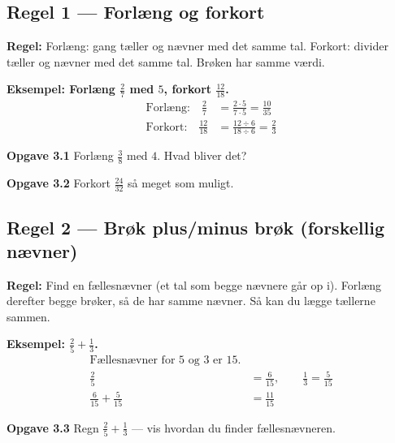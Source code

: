 \documentclass[11pt,a4paper]{article}
\begin{document}
\subsection*{Regel 1 --- Forlæng og forkort}

\begin{regelbox}
\textbf{Regel:} Forlæng: gang tæller og nævner med det samme tal. Forkort:
divider tæller og nævner med det samme tal. Brøken har samme værdi.
\end{regelbox}

\textbf{Eksempel: Forlæng $\tfrac{2}{7}$ med $5$, forkort $\tfrac{12}{18}$.}
\begin{align*}
  \text{Forlæng:} \quad \frac{2}{7} &= \frac{2\cdot 5}{7\cdot 5} = \frac{10}{35}\\[4pt]
  \text{Forkort:} \quad \frac{12}{18} &= \frac{12\div 6}{18\div 6} = \frac{2}{3}
\end{align*}

\begin{opgavebox}
\textbf{Opgave 3.1} \quad Forlæng $\tfrac{3}{8}$ med $4$. Hvad bliver det?
\end{opgavebox}

\begin{opgavebox}
\textbf{Opgave 3.2} \quad Forkort $\tfrac{24}{32}$ så meget som muligt.
\end{opgavebox}

\subsection*{Regel 2 --- Brøk plus/minus brøk (forskellig nævner)}

\begin{regelbox}
\textbf{Regel:} Find en fællesnævner (et tal som begge nævnere går op i).
Forlæng derefter begge brøker, så de har samme nævner. Så kan du lægge
tællerne sammen.
\end{regelbox}

\textbf{Eksempel: $\tfrac{2}{5} + \tfrac{1}{3}$.}
\begin{align*}
  \text{Fællesnævner for $5$ og $3$ er $15$.}\\
  \frac{2}{5} &= \frac{6}{15}, \qquad \frac{1}{3} = \frac{5}{15}\\[4pt]
  \frac{6}{15} + \frac{5}{15} &= \frac{11}{15}
\end{align*}

\begin{opgavebox}
\textbf{Opgave 3.3} \quad Regn $\tfrac{2}{5} + \tfrac{1}{3}$ --- vis hvordan
du finder fællesnævneren.
\end{opgavebox}
\end{document}
